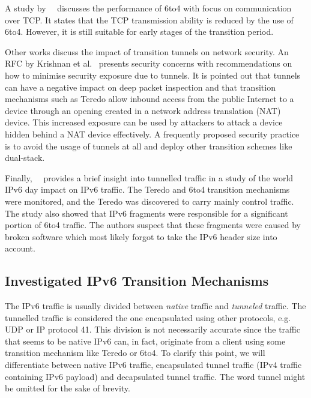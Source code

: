 A study by~\citeauthor{Bahaman-2012-Network}~\cite{Bahaman-2012-Network} discusses the performance of 6to4 with focus on communication over TCP. It states that the TCP transmission ability is reduced by the use of 6to4. However, it is still suitable for early stages of the transition period.

Other works discuss the impact of transition tunnels on network security. An RFC by Krishnan et al.~\cite{rfc6169} presents security concerns with recommendations on how to minimise security exposure due to tunnels. It is pointed out that tunnels can have a negative impact on deep packet inspection and that transition mechanisms such as Teredo allow inbound access from the public Internet to a device through an opening created in a network address translation (NAT) device. This increased exposure can be used by attackers to attack a device hidden behind a NAT device effectively. A frequently proposed security practice is to avoid the usage of tunnels at all and deploy other transition schemes like dual-stack.

Finally,~\citeauthor{Sarrar-2012-Investigating}~\cite{Sarrar-2012-Investigating} provides a brief insight into tunnelled traffic in a study of the world IPv6 day impact on IPv6 traffic. The Teredo and 6to4 transition mechanisms were monitored, and the Teredo was discovered to carry mainly control traffic. The study also showed that IPv6 fragments were responsible for a significant portion of 6to4 traffic. The authors suspect that these fragments were caused by broken software which most likely forgot to take the IPv6 header size into account.

\subsection{Investigated IPv6 Transition Mechanisms} \label{subsec:ipv6-tunnel-traffic}

The IPv6 traffic is usually divided between \emph{native} traffic and \emph{tunneled} traffic. The tunnelled traffic is considered the one encapsulated using other protocols, e.g. UDP or IP protocol 41. This division is not necessarily accurate since the traffic that seems to be native IPv6 can, in fact, originate from a client using some transition mechanism like Teredo or 6to4. To clarify this point, we will differentiate between native IPv6 traffic, encapsulated tunnel traffic (IPv4 traffic containing IPv6 payload) and decapsulated tunnel traffic. The word tunnel might be omitted for the sake of brevity. 

